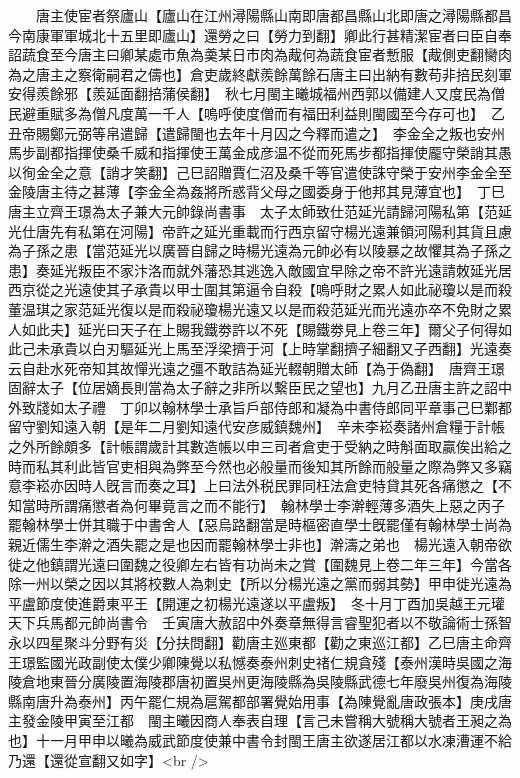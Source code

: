 　　唐主使宦者祭廬山【廬山在江州潯陽縣山南即唐都昌縣山北即唐之潯陽縣都昌今南康軍軍城北十五里即廬山】還勞之曰【勞力到翻】卿此行甚精潔宦者曰臣自奉詔蔬食至今唐主曰卿某處市魚為羮某日市肉為胾何為蔬食宦者慙服【胾側吏翻臠肉為之唐主之察衛嗣君之儔也】倉吏歲終獻羨餘萬餘石唐主曰出納有數苟非掊民刻軍安得羨餘邪【羨延面翻掊蒲侯翻】　秋七月閩主曦城福州西郭以備建人又度民為僧民避重賦多為僧凡度萬一千人【嗚呼使度僧而有福田利益則閩國至今存可也】　乙丑帝賜鄭元弼等帛遣歸【遣歸閩也去年十月囚之今釋而遣之】　李金全之叛也安州馬步副都指揮使桑千威和指揮使王萬金成彦温不從而死馬步都指揮使龎守榮誚其愚以徇金全之意【誚才笑翻】己巳詔贈賈仁沼及桑千等官遣使誅守榮于安州李金全至金陵唐主待之甚薄【李金全為姦將所惑背父母之國委身于他邦其見薄宜也】　丁巳唐主立齊王璟為太子兼大元帥錄尚書事　太子太師致仕范延光請歸河陽私第【范延光仕唐先有私第在河陽】帝許之延光重載而行西京留守楊光遠兼領河陽利其貨且慮為子孫之患【當范延光以廣晉自歸之時楊光遠為元帥必有以陵暴之故懼其為子孫之患】奏延光叛臣不家汴洛而就外藩恐其逃逸入敵國宜早除之帝不許光遠請敇延光居西京從之光遠使其子承貴以甲士圍其第逼令自殺【嗚呼財之累人如此祕瓊以是而殺董温琪之家范延光復以是而殺祕瓊楊光遠又以是而殺范延光而光遠亦卒不免財之累人如此夫】延光曰天子在上賜我鐵劵許以不死【賜鐵劵見上卷三年】爾父子何得如此己未承貴以白刃驅延光上馬至浮梁擠于河【上時掌翻擠子細翻又子西翻】光遠奏云自赴水死帝知其故憚光遠之彊不敢詰為延光輟朝贈太師【為于偽翻】　唐齊王璟固辭太子【位居嫡長則當為太子辭之非所以繋臣民之望也】九月乙丑唐主許之詔中外致牋如太子禮　丁卯以翰林學士承旨戶部侍郎和凝為中書侍郎同平章事己巳鄴都留守劉知遠入朝【是年二月劉知遠代安彦威鎮魏州】　辛未李崧奏諸州倉糧于計帳之外所餘頗多【計帳謂歲計其數造帳以申三司者倉吏于受納之時斛面取贏俟出給之時而私其利此皆官吏相與為弊至今然也必般量而後知其所餘而般量之際為弊又多竊意李崧亦因時人旣言而奏之耳】上曰法外税民罪同枉法倉吏特貸其死各痛懲之【不知當時所謂痛懲者為何畢竟言之而不能行】　翰林學士李澣輕薄多酒失上惡之丙子罷翰林學士併其職于中書舍人【惡烏路翻當是時樞密直學士旣罷僅有翰林學士尚為親近儒生李澣之酒失罷之是也因而罷翰林學士非也】澣濤之弟也　楊光遠入朝帝欲徙之他鎮謂光遠曰圍魏之役卿左右皆有功尚未之賞【圍魏見上卷二年三年】今當各除一州以榮之因以其將校數人為刺史【所以分楊光遠之黨而弱其勢】甲申徙光遠為平盧節度使進爵東平王【開運之初楊光遠遂以平盧叛】　冬十月丁酉加吳越王元瓘天下兵馬都元帥尚書令　壬寅唐大赦詔中外奏章無得言睿聖犯者以不敬論術士孫智永以四星聚斗分野有災【分扶問翻】勸唐主廵東都【勸之東巡江都】乙巳唐主命齊王璟監國光政副使太僕少卿陳覺以私憾奏泰州刺史禇仁規貪殘【泰州漢時吳國之海陵倉地東晉分廣陵置海陵郡唐初置吳州更海陵縣為吳陵縣武德七年廢吳州復為海陵縣南唐升為泰州】丙午罷仁規為扈駕都部署覺始用事【為陳覺亂唐政張本】庚戌唐主發金陵甲寅至江都　閩主曦因商人奉表自理【言己未嘗稱大號稱大號者王昶之為也】十一月甲申以曦為威武節度使兼中書令封閩王唐主欲遂居江都以水凍漕運不給乃還【還從宣翻又如字】<br />
